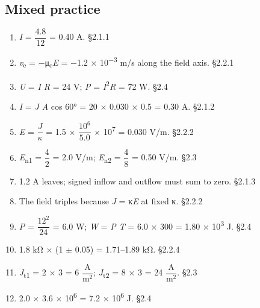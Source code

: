 \documentclass[11pt]{article}
\begin{document}
\begin{keepsection}\subsection{Mixed practice}

\begin{enumerate}
\item \textit{I} = {\small\ensuremath{\dfrac{4.8}{12}}} = 0.40 A. \hfill{\small\color{FAUblue}§2.1.1}
\item \textit{v}\textsubscript{e} = \ensuremath{-}μ\textsubscript{e}\textit{E} = \ensuremath{-}1.2 \ensuremath{\times} 10\textsuperscript{\ensuremath{-}3} m/s along the field axis. \hfill{\small\color{FAUblue}§2.2.1}
\item \textit{U} = \textit{I R} = 24 V; \textit{P} = \textit{I}\textsuperscript{2}\textit{R} = 72 W. \hfill{\small\color{FAUblue}§2.4}
\item \textit{I} = \textit{J A} cos 60° = 20 \ensuremath{\times} 0.030 \ensuremath{\times} 0.5 = 0.30 A. \hfill{\small\color{FAUblue}§2.1.2}
\item \textit{E} = {\small\ensuremath{\dfrac{{J}}{κ}}} = 1.5 \ensuremath{\times} {\small\ensuremath{\dfrac{10^{6}}{5.0}}} \ensuremath{\times} 10\textsuperscript{7} = 0.030 V/m. \hfill{\small\color{FAUblue}§2.2.2}
\item \textit{E}\textsubscript{n1} = {\small\ensuremath{\dfrac{4}{2}}} = 2.0 V/m; \textit{E}\textsubscript{n2} = {\small\ensuremath{\dfrac{4}{8}}} = 0.50 V/m. \hfill{\small\color{FAUblue}§2.3}
\item 1.2 A leaves; signed inflow and outflow must sum to zero. \hfill{\small\color{FAUblue}§2.1.3}
\item The field triples because \textit{J} = κ\textit{E} at fixed κ. \hfill{\small\color{FAUblue}§2.2.2}
\item \textit{P} = {\small\ensuremath{\dfrac{12^{2}}{24}}} = 6.0 W; \textit{W} = \textit{P T} = 6.0 \ensuremath{\times} 300 = 1.80 \ensuremath{\times} 10\textsuperscript{3} J. \hfill{\small\color{FAUblue}§2.4}
\item 1.8 kΩ \ensuremath{\times} (1 \ensuremath{\pm} 0.05) = 1.71–1.89 kΩ. \hfill{\small\color{FAUblue}§2.2.4}
\item \textit{J}\textsubscript{t1} = 2 \ensuremath{\times} 3 = 6 {\small\ensuremath{\dfrac{\mathrm{A}}{\mathrm{m}^{2}}}}; \textit{J}\textsubscript{t2} = 8 \ensuremath{\times} 3 = 24 {\small\ensuremath{\dfrac{\mathrm{A}}{\mathrm{m}^{2}}}}. \hfill{\small\color{FAUblue}§2.3}
\item 2.0 \ensuremath{\times} 3.6 \ensuremath{\times} 10\textsuperscript{6} = 7.2 \ensuremath{\times} 10\textsuperscript{6} J. \hfill{\small\color{FAUblue}§2.4}

\end{enumerate}
\end{keepsection}
\end{document}
